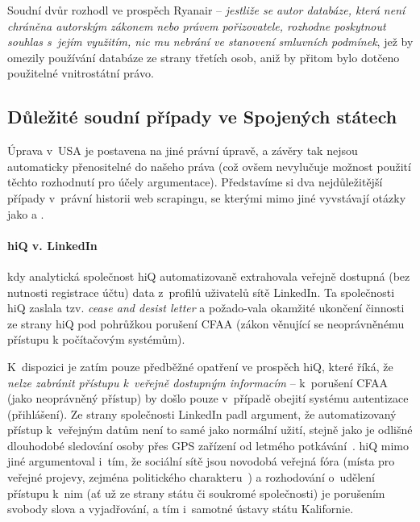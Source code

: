 \documentclass[thesis=B,czech]{FITthesis}[2012/06/26]
\begin{document}
Soudní dvůr rozhodl ve prospěch Ryanair -- \emph{jestliže se autor databáze, která není chráněna autorským zákonem nebo právem pořizovatele, rozhodne poskytnout souhlas s~jejím využitím, nic mu nebrání ve stanovení smluvních podmínek}, jež by omezily používání databáze ze strany třetích osob, aniž by přitom bylo dotčeno použitelné vnitrostátní právo.~\cite{C-30/14}

\subsection{Důležité soudní případy ve Spojených státech}
Úprava v USA je postavena na jiné právní úpravě, a závěry tak nejsou automaticky přenositelné do našeho práva (což ovšem nevylučuje možnost použití těchto rozhodnutí pro účely argumentace). Představíme si dva nejdůležitější případy v~právní historii web scrapingu, se kterými mimo jiné vyvstávají otázky jako  a .

\paragraph{hiQ v. LinkedIn} kdy analytická společnost hiQ automatizovaně extrahovala veřejně dostupná (bez nutnosti registrace účtu) data z~profilů uživatelů sítě LinkedIn. Ta společnosti hiQ zaslala tzv. \textit{cease and desist letter} a požado-vala okamžité ukončení činnosti ze strany hiQ pod pohrůžkou porušení CFAA (zákon věnující se neoprávněnému přístupu k počítačovým systémům). \cite{hiq_linkedin_1}

K~dispozici je zatím pouze předběžné opatření ve prospěch hiQ, které říká, že \textit{nelze zabránit přístupu k~veřejně dostupným informacím} -- k~porušení CFAA (jako neoprávněný přístup) by došlo pouze v~případě obejití systému autentizace (přihlášení). Ze strany společnosti LinkedIn padl argument, že automatizovaný přístup k~veřejným datům není to samé jako normální  užití, stejně jako je odlišné dlouhodobé sledování osoby přes GPS zařízení od letmého potkávání~\cite{linkedin_arg}. hiQ mimo jiné argumentoval i~tím, že sociální sítě jsou novodobá veřejná fóra (místa pro veřejné projevy, zejména politického charakteru~\cite{public_forum}) a rozhodování o~udělení přístupu k~nim (ať už ze strany státu či soukromé společnosti) je porušením svobody slova a vyjadřování, a tím i~samotné ústavy státu Kalifornie.~\cite{hiq_linkedin_2}
\end{document}
